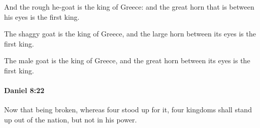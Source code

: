 			\begin{versebox}
					\item[BHS] 
					\item[LXX] 
					\item[ASV] And the rough he-goat is the king of Greece: and the great horn that is between his eyes is the first king.
					\item[NIV] The shaggy goat is the king of Greece, and the large horn between its eyes is the first king.
					\item[NRSV] The male goat is the king of Greece, and the great horn between its eyes is the first king.
			\end{versebox}

		\paragraph{Daniel 8:22} %
			\label{DANIEL-8-22}

			Now that being broken, whereas four stood up for it, four kingdoms shall stand up out of the nation, but not in his power.

